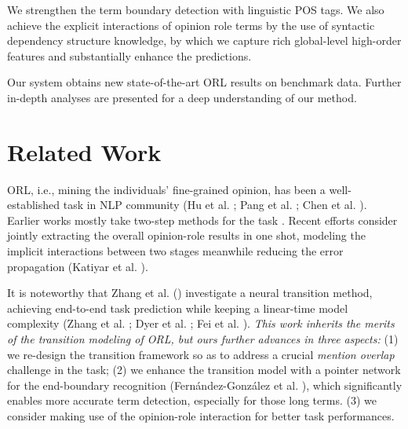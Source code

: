 \documentclass[letterpaper]{article} \usepackage{aaai22}  \usepackage{times}  \usepackage{helvet}  \usepackage{courier}  \usepackage[hyphens]{url}  \usepackage{graphicx} \urlstyle{rm} \def\UrlFont{\rm}  \usepackage{natbib}  \usepackage{caption} \DeclareCaptionStyle{ruled}{labelfont=normalfont,labelsep=colon,strut=off} \frenchspacing  \setlength{\pdfpagewidth}{8.5in}  \setlength{\pdfpageheight}{11in}  \usepackage{algorithm}
\begin{document}
 We strengthen the term boundary detection with linguistic POS tags.
We also achieve the explicit interactions of opinion role terms by the use of syntactic dependency structure knowledge, by which we capture rich global-level high-order features and substantially enhance the predictions. 



 Our system obtains new state-of-the-art ORL results on benchmark data.
Further in-depth analyses are presented for a deep understanding of our method.











 




\section{Related Work}


ORL, i.e., mining the individuals' fine-grained opinion, has been a well-established task in NLP community (Hu et al. \citeyear{HuL04}; Pang et al. \citeyear{PangL07}; Chen et al. \citeyear{ChenC16}).
Earlier works mostly take two-step methods for the task \cite{BreckCC07,yang-cardie-2012-extracting,marasovic-frank-2018-srl4orl,zhang-etal-2019-enhancing}.
Recent efforts consider jointly extracting the overall opinion-role results in one shot, modeling the implicit interactions between two stages meanwhile reducing the error propagation (Katiyar et al. \citeyear{katiyar-cardie-2016-investigating}).




It is noteworthy that Zhang et al. (\citeyear{ZhangWF19}) investigate a neural transition method, achieving end-to-end task prediction while keeping a linear-time model complexity (Zhang et al. \citeyear{zhang-clark-2010-fast}; Dyer et al. \citeyear{dyer-etal-2015-transition}; Fei et al. \citeyear{0001ZLJ21}).
\textit{This work inherits the merits of the transition modeling of ORL, but ours further advances in three aspects:}
(1) we re-design the transition framework so as to address a crucial \emph{mention overlap} challenge in the task;
(2) we enhance the transition model with a pointer network for the end-boundary recognition (Fern{\'a}ndez-Gonz{\'a}lez et al. \citeyear{fernandez-2020-transition}), which significantly enables more accurate term detection, especially for those long terms.
(3) we consider making use of the opinion-role interaction for better task performances.
\end{document}
